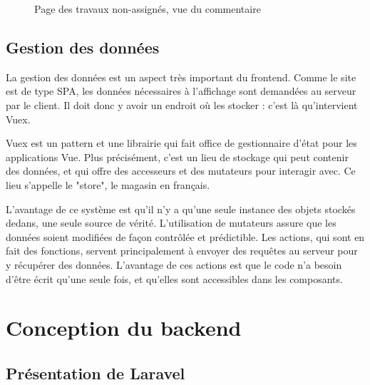 \documentclass[
    iai, %
    eai, %
]{heig-tb}
\begin{document}
\begin{figure}[h!]
  \caption{Page des travaux non-assignés, vue du commentaire}
\end{figure}

\section{Gestion des données}
La gestion des données est un aspect très important du frontend.
Comme le site est de type SPA, les données nécessaires à l'affichage sont demandées au serveur par le client.
Il doit donc y avoir un endroit où les stocker : c'est là qu'intervient Vuex.

Vuex est un pattern et une librairie qui fait office de gestionnaire d'état pour les applications Vue.
Plus précisément, c'est un lieu de stockage qui peut contenir des données, et qui offre des accesseurs et des mutateurs pour interagir avec.
Ce lieu s'appelle le "store", le magasin en français.

L'avantage de ce système est qu'il n'y a qu'une seule instance des objets stockés dedans, une seule source de vérité.
L'utilisation de mutateurs assure que les données soient  modifiées de façon contrôlée et prédictible.
Les actions, qui sont en fait des fonctions, servent principalement à envoyer des requêtes au serveur pour y récupérer des données.
L'avantage de ces actions est que le code n'a besoin d'être écrit qu'une seule fois, et qu'elles sont accessibles dans les composants.


\chapter{Conception du backend}
\section{Présentation de Laravel}
\end{document}
